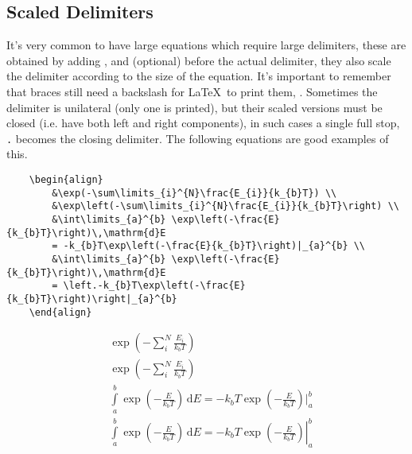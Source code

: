 \subsection{Scaled Delimiters}
%
It's very common to have large equations which require large
delimiters, these are obtained by adding , 
and  (optional) before the actual delimiter, they also
scale the delimiter according to the size of the equation.  It's
important to remember that braces still need a backslash for \LaTeX~to
print them,  .  Sometimes the delimiter is
unilateral (only one is printed), but their scaled versions must be
closed (i.e. have both left and right components), in such cases a
single full stop, \verb|.| becomes the closing delimiter. The
following equations are good examples of this.
\begin{verbatim}
	\begin{align}
	    &\exp(-\sum\limits_{i}^{N}\frac{E_{i}}{k_{b}T}) \\
	    &\exp\left(-\sum\limits_{i}^{N}\frac{E_{i}}{k_{b}T}\right) \\
	    &\int\limits_{a}^{b} \exp\left(-\frac{E}{k_{b}T}\right)\,\mathrm{d}E
	    = -k_{b}T\exp\left(-\frac{E}{k_{b}T}\right)|_{a}^{b} \\
	    &\int\limits_{a}^{b} \exp\left(-\frac{E}{k_{b}T}\right)\,\mathrm{d}E
	    = \left.-k_{b}T\exp\left(-\frac{E}{k_{b}T}\right)\right|_{a}^{b}
	\end{align}
\end{verbatim}
\begin{align}
    &\exp(-\sum\limits_{i}^{N}\frac{E_{i}}{k_{b}T}) \\
    &\exp\left(-\sum\limits_{i}^{N}\frac{E_{i}}{k_{b}T}\right) \\
    &\int\limits_{a}^{b} \exp\left(-\frac{E}{k_{b}T}\right)\,\mathrm{d}E
    = -k_{b}T\exp\left(-\frac{E}{k_{b}T}\right)|_{a}^{b} \\
    &\int\limits_{a}^{b} \exp\left(-\frac{E}{k_{b}T}\right)\,\mathrm{d}E = \left.-k_{b}T\exp\left(-\frac{E}{k_{b}T}\right)\right|_{a}^{b}
\end{align}
%
